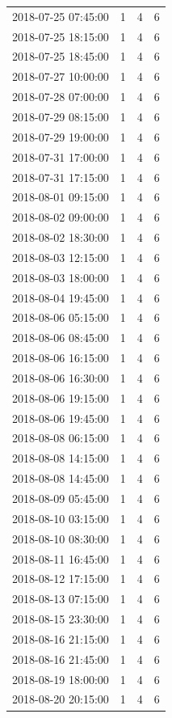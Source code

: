 \begin{tabular}{lrrr}
2018-07-25 07:45:00 & 1 & 4 & 6 \\
2018-07-25 18:15:00 & 1 & 4 & 6 \\
2018-07-25 18:45:00 & 1 & 4 & 6 \\
2018-07-27 10:00:00 & 1 & 4 & 6 \\
2018-07-28 07:00:00 & 1 & 4 & 6 \\
2018-07-29 08:15:00 & 1 & 4 & 6 \\
2018-07-29 19:00:00 & 1 & 4 & 6 \\
2018-07-31 17:00:00 & 1 & 4 & 6 \\
2018-07-31 17:15:00 & 1 & 4 & 6 \\
2018-08-01 09:15:00 & 1 & 4 & 6 \\
2018-08-02 09:00:00 & 1 & 4 & 6 \\
2018-08-02 18:30:00 & 1 & 4 & 6 \\
2018-08-03 12:15:00 & 1 & 4 & 6 \\
2018-08-03 18:00:00 & 1 & 4 & 6 \\
2018-08-04 19:45:00 & 1 & 4 & 6 \\
2018-08-06 05:15:00 & 1 & 4 & 6 \\
2018-08-06 08:45:00 & 1 & 4 & 6 \\
2018-08-06 16:15:00 & 1 & 4 & 6 \\
2018-08-06 16:30:00 & 1 & 4 & 6 \\
2018-08-06 19:15:00 & 1 & 4 & 6 \\
2018-08-06 19:45:00 & 1 & 4 & 6 \\
2018-08-08 06:15:00 & 1 & 4 & 6 \\
2018-08-08 14:15:00 & 1 & 4 & 6 \\
2018-08-08 14:45:00 & 1 & 4 & 6 \\
2018-08-09 05:45:00 & 1 & 4 & 6 \\
2018-08-10 03:15:00 & 1 & 4 & 6 \\
2018-08-10 08:30:00 & 1 & 4 & 6 \\
2018-08-11 16:45:00 & 1 & 4 & 6 \\
2018-08-12 17:15:00 & 1 & 4 & 6 \\
2018-08-13 07:15:00 & 1 & 4 & 6 \\
2018-08-15 23:30:00 & 1 & 4 & 6 \\
2018-08-16 21:15:00 & 1 & 4 & 6 \\
2018-08-16 21:45:00 & 1 & 4 & 6 \\
2018-08-19 18:00:00 & 1 & 4 & 6 \\
2018-08-20 20:15:00 & 1 & 4 & 6 \\

\end{tabular}
